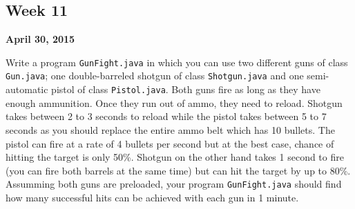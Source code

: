 \documentclass[12pt,letterpaper,twoside]{article}
\begin{document}




\subsection*{Week 11}
\hfill \textbf{April 30, 2015}

Write a program \texttt{GunFight.java} in which you can use two different guns of class \texttt{Gun.java}; one double-barreled shotgun of class \texttt{Shotgun.java} and one semi-automatic pistol of class \texttt{Pistol.java}.
Both guns fire as long as they have enough ammunition.
Once they run out of ammo, they need to reload.
Shotgun takes between 2 to 3 seconds to reload while the pistol takes between 5 to 7 seconds as you should replace the entire ammo belt which has 10 bullets.
The pistol can fire at a rate of 4 bullets per second but at the best case, chance of hitting the target is only 50\%.
Shotgun on the other hand takes 1 second to fire (you can fire both barrels at the same time) but can hit the target by up to 80\%.
Assumming both guns are preloaded, your program \texttt{GunFight.java} should find how many successful hits can be achieved with each gun in 1 minute.
\end{document}
